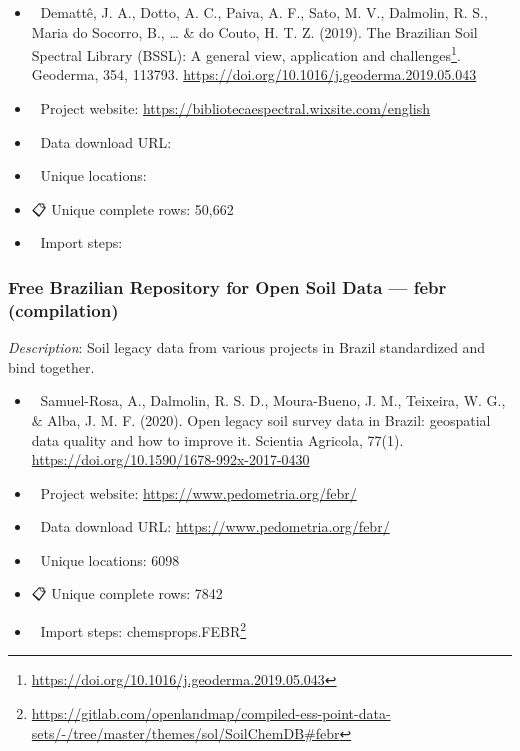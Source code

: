 \documentclass[
  graybox,natbib,nospthms]{svmono}
\providecommand{\tightlist}{%
  \setlength{\itemsep}{0pt}\setlength{\parskip}{0pt}}
\providecommand{\tightlist}{\setlength{\itemsep}{0pt}\setlength{\parskip}{0pt}}
\renewcommand{\href}[2]{#2 (\url{#1})}
\renewcommand{\href}[2]{#2\footnote{\url{#1}}}
\begin{document}
\begin{itemize}
\tightlist
\item
  📕 Demattê, J. A., Dotto, A. C., Paiva, A. F., Sato, M. V., Dalmolin, R. S., Maria do Socorro, B., \ldots{} \& do Couto, H. T. Z. (2019). \href{https://doi.org/10.1016/j.geoderma.2019.05.043}{The Brazilian Soil Spectral Library (BSSL): A general view, application and challenges}. Geoderma, 354, 113793. \url{https://doi.org/10.1016/j.geoderma.2019.05.043}\\
\item
  🔗 Project website: \url{https://bibliotecaespectral.wixsite.com/english}\\
\item
  📂 Data download URL:\\
\item
  📍 Unique locations:\\
\item
  📋 Unique complete rows: 50,662\\
\item
  📝 Import steps:
\end{itemize}

\hypertarget{free-brazilian-repository-for-open-soil-data-febr-compilation}{%
\subsubsection{Free Brazilian Repository for Open Soil Data --- febr (compilation)}\label{free-brazilian-repository-for-open-soil-data-febr-compilation}}

\emph{Description}: Soil legacy data from various projects in Brazil standardized and bind together.

\begin{itemize}
\tightlist
\item
  📕 Samuel-Rosa, A., Dalmolin, R. S. D., Moura-Bueno, J. M., Teixeira, W. G., \& Alba, J. M. F. (2020). Open legacy soil survey data in Brazil: geospatial data quality and how to improve it. Scientia Agricola, 77(1). \url{https://doi.org/10.1590/1678-992x-2017-0430}\\
\item
  🔗 Project website: \url{https://www.pedometria.org/febr/}\\
\item
  📂 Data download URL: \url{https://www.pedometria.org/febr/}\\
\item
  📍 Unique locations: 6098\\
\item
  📋 Unique complete rows: 7842\\
\item
  📝 Import steps: \href{https://gitlab.com/openlandmap/compiled-ess-point-data-sets/-/tree/master/themes/sol/SoilChemDB\#febr}{chemsprops.FEBR}
\end{itemize}
\end{document}
